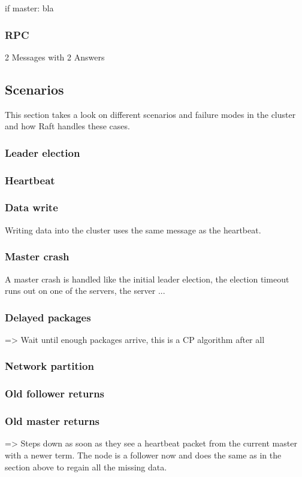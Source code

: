 if master:
  bla


\subsubsection{RPC}
2 Messages with 2 Answers


\subsection{Scenarios}
This section takes a look on different scenarios and failure modes in the cluster and how Raft handles these cases.

\subsubsection{Leader election}

\subsubsection{Heartbeat}

\subsubsection{Data write}
Writing data into the cluster uses the same message as the heartbeat.


\subsubsection{Master crash}
A master crash is handled like the initial leader election, the election timeout runs out on one of the servers, the server ...

\subsubsection{Delayed packages}
=> Wait until enough packages arrive, this is a CP algorithm after all

\subsubsection{Network partition}

\subsubsection{Old follower returns}


\subsubsection{Old master returns}
=> Steps down as soon as they see a heartbeat packet from the current master with a newer term.
The node is a follower now and does the same as in the section above to regain all the missing data.

